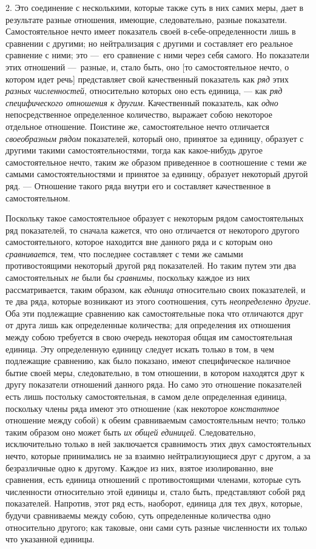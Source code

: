 2. Это соединение с несколькими, которые также суть в них самих меры, дает в
результате разные отношения, имеющие, следовательно, разные показатели.
Самостоятельное нечто имеет показатель своей в-себе-определенности лишь в
сравнении с другими; но нейтрализация с другими и составляет его реальное
сравнение с ними; это —~его сравнение с ними через себя самого. Но
показатели этих отношений —~разные, и, стало быть, оно [то самостоятельное
нечто, о котором идет речь] представляет свой качественный показатель как
{\em ряд} этих {\em разных
численностей}, относительно которых оно есть единица, — как
{\em ряд специфического отношения к другим}.
Качественный показатель, как {\em одно}
непосредственное определенное количество, выражает собою некоторое
отдельное отношение. Поистине же, самостоятельное нечто отличается
{\em своеобразным рядом} показателей, который оно,
принятое за единицу, образует с другими такими самостоятельностями, тогда
как какое-нибудь другое самостоятельное нечто, таким же образом приведенное
в соотношение с теми же самыми самостоятельностями и принятое за единицу,
образует некоторый другой ряд. — Отношение такого ряда внутри его и
составляет качественное в самостоятельном.

Поскольку такое самостоятельное образует с некоторым рядом самостоятельных
ряд показателей, то сначала кажется, что оно отличается от некоторого
другого самостоятельного, которое находится вне данного ряда и с которым
оно {\em сравнивается}, тем, что последнее составляет с
теми же самыми противостоящими некоторый другой ряд показателей. Но таким
путем эти два самостоятельных {\em не} были бы
{\em сравнимы}, поскольку каждое из них
рассматривается, таким образом, как {\em единица}
относительно своих показателей, и те два ряда, которые возникают из этого
соотношения, суть {\em неопределенно другие}. Оба эти
подлежащие сравнению как самостоятельные пока что отличаются друг от друга
лишь как определенные количества; для определения их отношения между собою
требуется в свою очередь некоторая общая им самостоятельная единица. Эту
определенную единицу следует искать только в том, в чем подлежащие
сравнению, как было показано, имеют специфическое наличное бытие своей
меры, следовательно, в том отношении, в котором находятся друг к другу
показатели отношений данного ряда. Но само это отношение показателей есть
лишь постольку самостоятельная, в самом деле определенная единица,
поскольку члены ряда имеют это отношение (как некоторое
{\em константное} отношение между собой) к обеим
сравниваемым самостоятельным нечто; только таким образом оно может быть
{\em их общей единицей}. Следовательно, исключительно
только в ней заключается сравнимость этих двух самостоятельных нечто,
которые принимались не за взаимно нейтрализующиеся друг с другом, а за
безразличные одно к другому. Каждое из них, взятое изолированно, вне
сравнения, есть единица отношений с противостоящими членами, которые суть
численности относительно этой единицы и, стало быть, представляют собой ряд
показателей. Напротив, этот ряд есть, наоборот, единица для тех двух,
которые, будучи сравниваемы между собою, суть определенные количества одно
относительно другого; как таковые, они сами суть разные численности их
только что указанной единицы.

